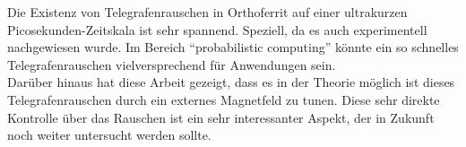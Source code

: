 \documentclass[main.tex]{subfiles}
\begin{document}

Die Existenz von Telegrafenrauschen in Orthoferrit auf einer ultrakurzen Picosekunden-Zeitskala ist sehr spannend. Speziell, da es auch experimentell nachgewiesen wurde. Im Bereich \enquote{probabilistic computing} könnte ein so schnelles Telegrafenrauschen vielversprechend für Anwendungen sein.\\

Darüber hinaus hat diese Arbeit gezeigt, dass es in der Theorie möglich ist dieses Telegrafenrauschen durch ein externes Magnetfeld zu tunen. Diese sehr direkte Kontrolle über das Rauschen ist ein sehr interessanter Aspekt, der in Zukunft noch weiter untersucht werden sollte.
\end{document}
